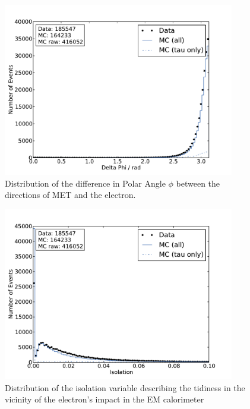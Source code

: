 \documentclass[
	paper=A4,
	parskip=full,
	chapterprefix=true,
	12pt,
	headings=normal,
	bibliography=totoc,
	listof=totoc,
	titlepage=on,
]{scrreprt}
\begin{document}
\begin{figure}[htbp]
	\centering
	\includegraphics[width=0.9\textwidth]{nocuts/delta_phi}
	\caption{Distribution of the difference in Polar Angle $\phi$ between the directions of MET and the electron.}
	\label{fig:no_cuts_dphi}
\end{figure}
\begin{figure}[htbp]
	\centering
	\includegraphics[width=0.9\textwidth]{nocuts/el_iso}
	\caption{Distribution of the isolation variable describing the tidiness in the vicinity of the electron's impact in the EM calorimeter}
	\label{fig:no_cuts_iso}
\end{figure}
\end{document}
